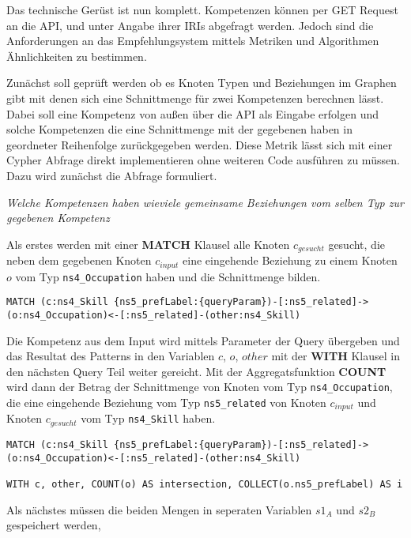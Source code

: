 Das technische Gerüst ist nun komplett. Kompetenzen können per GET Request an die API, und unter Angabe ihrer IRIs abgefragt werden. Jedoch sind die Anforderungen an das Empfehlungsystem mittels Metriken und Algorithmen Ähnlichkeiten zu bestimmen. 

Zunächst soll geprüft werden ob es Knoten Typen und Beziehungen im Graphen gibt mit denen sich eine Schnittmenge für zwei Kompetenzen berechnen lässt. Dabei soll eine Kompetenz von außen über die API als Eingabe erfolgen und solche Kompetenzen die eine Schnittmenge mit der gegebenen haben in geordneter Reihenfolge zurückgegeben werden. Diese Metrik lässt sich mit einer Cypher Abfrage direkt implementieren ohne weiteren Code ausführen zu müssen. Dazu wird zunächst die Abfrage formuliert. 

\textit{Welche Kompetenzen haben wieviele gemeinsame Beziehungen vom selben Typ zur gegebenen Kompetenz}

Als erstes werden mit einer \textbf{MATCH} Klausel alle Knoten $c_{gesucht}$ gesucht, die neben dem gegebenen Knoten $c_{input}$ eine eingehende Beziehung zu einem Knoten $o$ vom Typ \texttt{ns4\_Occupation} haben und die Schnittmenge bilden. 

\begin{lstlisting}
MATCH (c:ns4_Skill {ns5_prefLabel:{queryParam})-[:ns5_related]->(o:ns4_Occupation)<-[:ns5_related]-(other:ns4_Skill)
\end{lstlisting}



Die Kompetenz aus dem Input wird mittels Parameter der Query übergeben und das Resultat des Patterns in den Variablen $c$, $o$, $other$  mit der \textbf{WITH} Klausel in den nächsten Query Teil weiter gereicht. Mit der Aggregatsfunktion \textbf{COUNT} wird dann der Betrag der Schnittmenge von Knoten vom Typ \texttt{ns4\_Occupation}, die eine eingehende Beziehung vom Typ \texttt{ns5\_related} von Knoten $c_{input}$ und Knoten $c_{gesucht}$ vom Typ \texttt{ns4\_Skill} haben. 

\begin{lstlisting}
MATCH (c:ns4_Skill {ns5_prefLabel:{queryParam})-[:ns5_related]->(o:ns4_Occupation)<-[:ns5_related]-(other:ns4_Skill)

WITH c, other, COUNT(o) AS intersection, COLLECT(o.ns5_prefLabel) AS i

\end{lstlisting}

Als nächstes müssen die beiden Mengen in seperaten Variablen $s1_{A}$ und $s2_{B}$ gespeichert werden,

